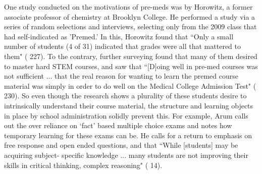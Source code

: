 \documentclass [12pt]{article}
\begin{document}
\begin{flushleft}
One study conducted on the motivations of pre-meds was by Horowitz, a former associate professor of chemistry at Brooklyn College. He performed a study via a series of random selections and interviews, selecting only from the 2009 class that had self-indicated as 'Premed.' In this, Horowitz found that  {``}Only a small number of students (4 of 31) indicated that grades were all that mattered to them" (\cite{Horowitz-2010} 227). To the contrary, further surveying found that many of them desired to master hard STEM courses, and saw that {``}[D]oing well in pre-med courses was not sufficient ... that the real reason for wanting to learn the premed course material was simply in order to do well on the Medical College Admission Test" (\cite{Horowitz-2010} 230). So even though the research shows a plurality of these students desire to intrinsically understand their course material, the structure and learning objects in place by school administration solidly prevent this. For example, Arum calls out the over reliance on {`}fact' based multiple choice exams and notes how temporary learning for these exams can be. He calls for a return to emphasis on free response and open ended questions, and that {``}While [students] may be acquiring subject- specific knowledge ...  many students are not improving their skills in critical thinking, complex reasoning" (\cite{Arum-2011} 14). 
	  
	
	
	
\newpage
\medskip %
\nocite{*} %
\printbibliography%
\end{flushleft}
\end{document}
